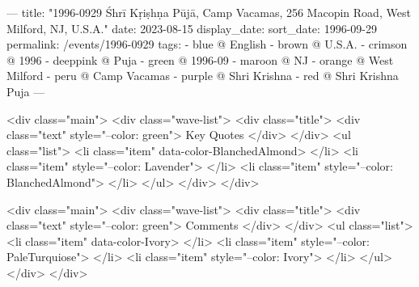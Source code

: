---
title: "1996-0929 Śhrī Kṛiṣhṇa Pūjā, Camp Vacamas, 256 Macopin Road, West Milford, NJ, U.S.A."
date: 2023-08-15
display_date: 
sort_date: 1996-09-29
permalink: /events/1996-0929
tags:
  - blue @ English
  - brown @ U.S.A.
  - crimson @ 1996
  - deeppink @ Puja
  - green @ 1996-09
  - maroon @ NJ
  - orange @ West Milford
  - peru @ Camp Vacamas
  - purple @ Shri Krishna
  - red @ Shri Krishna Puja
---

<div class="main">
  <div class="wave-list">
    <div class="title">
      <div class="text" style="--color: green">
        Key Quotes
      </div>
    </div>
    <ul class="list">
        <li class="item" data-color-BlanchedAlmond>
        </li>
        <li class="item" style="--color: Lavender">
        </li>
        <li class="item" style="--color: BlanchedAlmond">
        </li>
      </ul>
  </div>
</div>

<div class="main">
  <div class="wave-list">
    <div class="title">
      <div class="text" style="--color: green">
        Comments
      </div>
    </div>
    <ul class="list">
        <li class="item" data-color-Ivory>
        </li>
        <li class="item" style="--color: PaleTurquiose">
        </li>
        <li class="item" style="--color: Ivory">
        </li>
      </ul>
  </div>
</div>